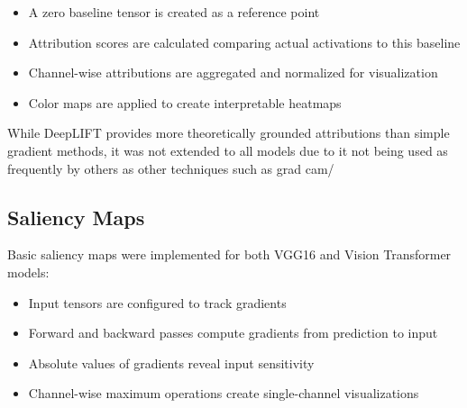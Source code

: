 \documentclass[a4paper,12pt]{report}
\begin{document}
\begin{itemize}
    \item A zero baseline tensor is created as a reference point
    \item Attribution scores are calculated comparing actual activations to this baseline
    \item Channel-wise attributions are aggregated and normalized for visualization
    \item Color maps are applied to create interpretable heatmaps
\end{itemize}

While DeepLIFT provides more theoretically grounded attributions than simple gradient methods, it was not extended to all models due to it not being used as frequently by others as other techniques such as grad cam/
\subsection{Saliency Maps}

Basic saliency maps were implemented for both VGG16 and Vision Transformer models:

\begin{itemize}
    \item Input tensors are configured to track gradients
    \item Forward and backward passes compute gradients from prediction to input
    \item Absolute values of gradients reveal input sensitivity
    \item Channel-wise maximum operations create single-channel visualizations
\end{itemize}




\end{document}
